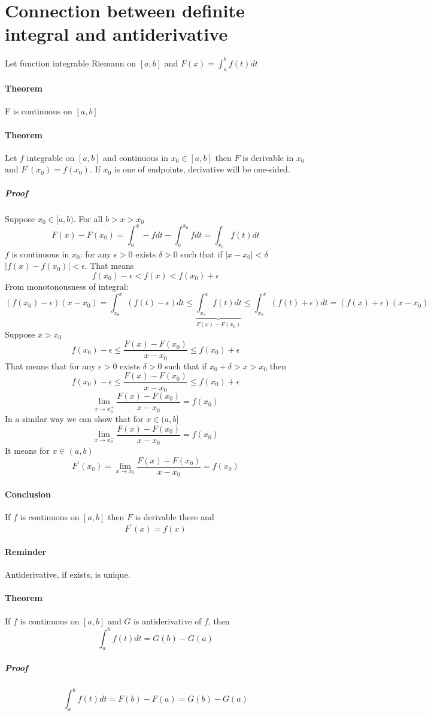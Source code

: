 \section{Connection between definite integral and antiderivative}
Let function integrable Riemann on $[a,b]$ and $F(x) = \int_a^b f(t) dt$
\paragraph{Theorem} F is continuous on $[a,b]$
\paragraph{Theorem} Let $f$ integrable on $[a,b]$ and continuous in $x_0 \in [a,b]$ then $F$ is derivable in $x_0$ and $F^\prime(x_0) = f(x_0)$. If $x_0$ is one of endpoints, derivative will be one-sided.
\subparagraph{Proof}
Suppose $x_0 \in [a,b)$. For all $b>x>x_0$ $$F(x)-F(x_0) = \int_a^x-f dt - \int_a^{x_0} f dt = \int_{x_0} f(t) dt$$
$f$ is continuous in $x_0$: for any $\epsilon > 0$ exists $\delta > 0$ such that if $|x-x_0| < \delta$ $|f(x)-f(x_0)| < \epsilon$. That means 
$$f(x_0) - \epsilon < f(x) < f(x_0) + \epsilon$$
From monotonousness of integral:
$$(f(x_0)-\epsilon)(x-x_0) = \int_{x_0}^x (f(t)-\epsilon) dt \leq \underbrace{\int_{x_0}^x f(t) dt}_{F(x)-F(x_0)} \leq \int_{x_0}^x (f(t) +\epsilon) dt = (f(x)+\epsilon)(x-x_0)$$ 
Suppose $x>x_0$
$$f(x_0) -\epsilon \leq \frac{F(x)-F(x_0)}{x-x_0} \leq f(x_0)+ \epsilon$$
That means that for any $\epsilon > 0$ exists $\delta > 0$ such that if $x_0+\delta > x > x_0$ then
$$f(x_0) -\epsilon \leq \frac{F(x)-F(x_0)}{x-x_0} \leq f(x_0)+ \epsilon$$
$$\lim_{x\to x_0^+} \frac{F(x)-F(x_0)}{x-x_0} = f(x_0)$$
In a similar way we can show that for $x \in (a,b]$
$$\lim_{x\to x_0^-} \frac{F(x)-F(x_0)}{x-x_0} = f(x_0)$$
It means for $x \in (a,b)$
$$F^\prime(x_0) = \lim_{x\to x_0}\frac{F(x)-F(x_0)}{x-x_0} = f(x_0)$$
\paragraph{Conclusion}
If $f$ is continuous on $[a,b]$ then $F$ is derivable there and $$F^\prime(x) = f(x)$$
\paragraph{Reminder} Antiderivative, if exists, is unique.
\paragraph{Theorem} If $f$ is continuous on $[a,b]$ and $G$ is antiderivative of $f$, then $$\int_a^b f(t) dt = G(b) -G(a)$$
\subparagraph{Proof}
$$\int_a^b f(t) dt =F(b) - F(a) = G(b) -G(a)$$
